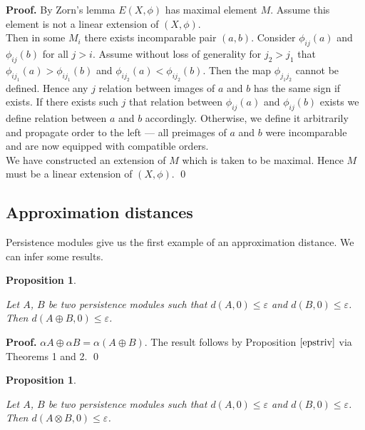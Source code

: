 \documentclass[english,12pt]{article}
\newcounter{stmcounter}[section]
\numberwithin{equation}{section}
\newtheorem{proposition}[stmcounter]{Proposition}
\theoremstyle{definition}
\theoremstyle{remark}
\newenvironment{pf}{\noindent\textbf{Proof.}}{\qed}
\renewcommand{\leq}{\leqslant}
\begin{document}
\begin{pf}
  By Zorn's lemma $E(X,\phi)$ has maximal element $M$. Assume this element is not a linear extension of $(X,\phi)$.\\

  Then in some $M_i$ there exists incomparable pair $(a,b)$. Consider $\phi_{ij}(a)$ and $\phi_{ij}(b)$ for all $j > i$. Assume without loss of generality for $j_2 > j_1$ that $\phi_{ij_1}(a) > \phi_{ij_1}(b)$ and $\phi_{ij_2}(a) < \phi_{ij_2}(b)$. Then the map $\phi_{j_1j_2}$ cannot be defined. Hence any $j$ relation between images of $a$ and $b$ has the same sign if exists. If there exists such $j$ that relation between $\phi_{ij}(a)$ and $\phi_{ij}(b)$ exists we define relation between $a$ and $b$ accordingly. Otherwise, we define it arbitrarily and propagate order to the left --- all preimages of $a$ and $b$ were incomparable and are now equipped with compatible orders.\\

  We have constructed an extension of $M$ which is taken to be maximal. Hence $M$ must be a linear extension of $(X,\phi)$.
\end{pf}

\subsection{Approximation distances}

Persistence modules give us the first example of an approximation distance. We can infer some results.\\

\begin{proposition} ~ \par
  \label{prop:sum}
  Let $A$, $B$ be two persistence modules such that $d(A,0) \leq \varepsilon$ and $d(B,0) \leq \varepsilon$. Then $d(A \oplus B,0) \leq \varepsilon$.
\end{proposition}

\begin{pf}
  $\alpha A \oplus \alpha B = \alpha(A \oplus B)$. The result follows by Proposition $\ref{epstriv}$ via Theorems 1 and 2.
\end{pf}

\begin{proposition} ~ \par
  \label{prop:tensor}
  Let $A$, $B$ be two persistence modules such that $d(A,0) \leq \varepsilon$ and $d(B,0) \leq \varepsilon$. Then $d(A \otimes B,0) \leq \varepsilon$.
\end{proposition}
\end{document}
